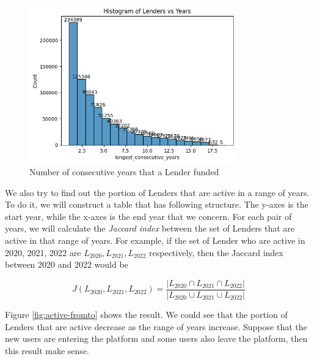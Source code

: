 \begin{figure}[H]
	\centering
	\includegraphics[width=0.8\textwidth]{images/active-hist.png}
	\caption{Number of consecutive years that a Lender funded}
	\label{fig:active-hist}
\end{figure}

We also try to find out the portion of Lenders that are active in a range of years.
To do it, we will construct a table that has following structure.
The y-axes is the start year,
while the x-axes is the end year that we concern.
For each pair of years, we will calculate the \textit{Jaccard index}
between the set of Lenders that are active in that range of years.
For example, if the set of Lender who are active in 2020, 2021, 2022 are
$L_{2020}, L_{2021}, L_{2022}$ respectively,
then the Jaccard index between 2020 and 2022 would be

\begin{equation}
	J(L_{2020}, L_{2021}, L_{2022}) = \frac{|L_{2020} \cap L_{2021} \cap L_{2022}|}{|L_{2020} \cup L_{2021} \cup L_{2022}|}
\end{equation}


Figure \ref{fig:active-fromto} shows the result.
We could see that the portion of Lenders that are active decrease as the range of years increase.
Suppose that the new users are entering the platform and some users also leave the platform,
then this result make sense.



